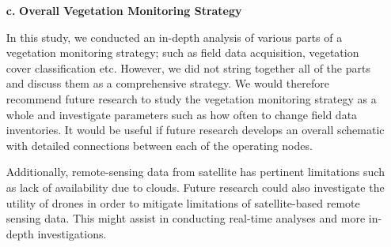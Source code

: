 \begin{itemize}
\item [\textbf{c.}] \textbf{Overall Vegetation Monitoring Strategy}\vspace{-0.25cm}

\justify
In this study, we conducted an in-depth analysis of various parts of a vegetation monitoring strategy; such as field data acquisition, vegetation cover classification etc. However, we did not string together all of the parts and discuss them as a comprehensive strategy. We would therefore recommend future research to study the vegetation monitoring strategy as a whole and investigate parameters such as how often to change field data inventories. It would be useful if future research develops an overall schematic with detailed connections between each of the operating nodes.

\justify
Additionally, remote-sensing data from satellite has pertinent limitations such as lack of availability due to clouds. Future research could also investigate the utility of drones in order to mitigate limitations of satellite-based remote sensing data. This might assist in conducting real-time analyses and more in-depth investigations.
\end{itemize}
